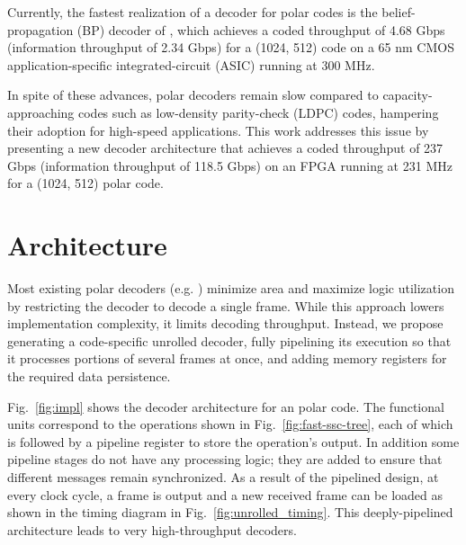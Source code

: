 \documentclass[letterpaper,onecolumn,journal,12pt]{IEEEtran}
\begin{document}
Currently, the fastest realization of a decoder for polar codes is the belief-propagation (BP) decoder of \cite{Park2014}, which achieves a coded throughput of 4.68 Gbps (information throughput of 2.34 Gbps) for a (1024, 512) code on a 65 nm CMOS  application-specific integrated-circuit (ASIC) running at 300 MHz.

In spite of these advances, polar decoders remain slow compared to capacity-approaching codes such as low-density parity-check (LDPC) codes, hampering their adoption for high-speed applications. This work addresses this issue by presenting a new decoder architecture that achieves a coded throughput of 237 Gbps (information throughput of 118.5 Gbps) on an FPGA running at 231 MHz for a (1024, 512) polar code.

\section{Architecture}
Most existing polar decoders (e.g. \cite{Raymond2014,Sarkis2014,Park2014}) minimize area and maximize logic utilization by restricting the decoder to decode a single frame. While this approach lowers implementation complexity, it limits decoding throughput. Instead, we propose generating a code-specific unrolled decoder, fully pipelining its execution so that it processes portions of several frames at once, and adding memory registers for the required data persistence.

Fig.~\ref{fig:impl} shows the decoder architecture for an  polar code. The functional units correspond to the operations shown in Fig.~\ref{fig:fast-ssc-tree}, each of which is followed by a pipeline register to store the operation's output. In addition some pipeline stages do not have any processing logic; they are added to ensure that different messages remain synchronized.
As a result of the pipelined design, at every clock cycle, a frame is output and a new received frame can be loaded as shown in the timing diagram in Fig.~\ref{fig:unrolled_timing}. This deeply-pipelined architecture leads to very high-throughput decoders.
\end{document}

